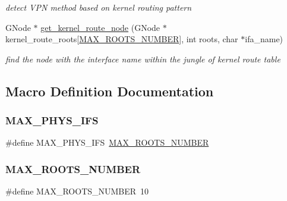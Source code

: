 \begin{DoxyCompactItemize}
\begin{DoxyCompactList}\small\item\em detect V\+PN method based on kernel routing pattern \end{DoxyCompactList}\item 
G\+Node $\ast$ \hyperlink{route-tree_8h_a77affcaa875961893c05c7e211678ed1}{get\+\_\+kernel\+\_\+route\+\_\+node} (G\+Node $\ast$kernel\+\_\+route\+\_\+roots\mbox{[}\hyperlink{route-tree_8h_a8e1da3af3417de420798c8b448b6a8cb}{M\+A\+X\+\_\+\+R\+O\+O\+T\+S\+\_\+\+N\+U\+M\+B\+ER}\mbox{]}, int roots, char $\ast$ifa\+\_\+name)
\begin{DoxyCompactList}\small\item\em find the node with the interface name within the jungle of kernel route table \end{DoxyCompactList}\end{DoxyCompactItemize}


\subsection{Macro Definition Documentation}
\mbox{\label{route-tree_8h_a5f66955385e84e67789d731b5cad24c7}} 
\subsubsection{\texorpdfstring{M\+A\+X\+\_\+\+P\+H\+Y\+S\+\_\+\+I\+FS}{MAX\_PHYS\_IFS}}
{\footnotesize\ttfamily \#define M\+A\+X\+\_\+\+P\+H\+Y\+S\+\_\+\+I\+FS~\hyperlink{route-tree_8h_a8e1da3af3417de420798c8b448b6a8cb}{M\+A\+X\+\_\+\+R\+O\+O\+T\+S\+\_\+\+N\+U\+M\+B\+ER}}

\mbox{\label{route-tree_8h_a8e1da3af3417de420798c8b448b6a8cb}} 
\subsubsection{\texorpdfstring{M\+A\+X\+\_\+\+R\+O\+O\+T\+S\+\_\+\+N\+U\+M\+B\+ER}{MAX\_ROOTS\_NUMBER}}
{\footnotesize\ttfamily \#define M\+A\+X\+\_\+\+R\+O\+O\+T\+S\+\_\+\+N\+U\+M\+B\+ER~10}

